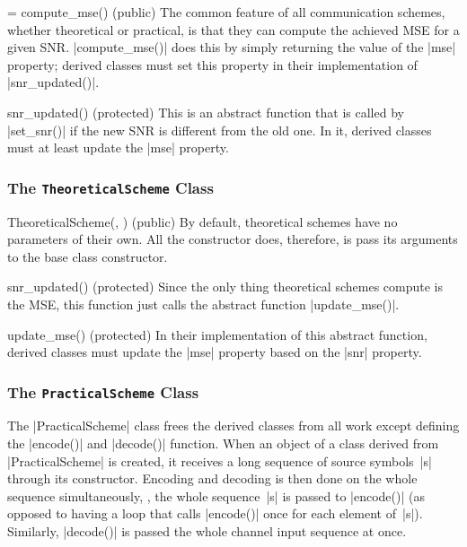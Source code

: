\begin{method}{ = compute_mse(\obj) (public)}
  The common feature of all communication schemes, whether theoretical or
  practical, is that they can compute the achieved MSE for a given SNR.
  |compute_mse()| does this by simply returning the value of the |mse| property;
  derived classes must set this property in their implementation of
  |snr_updated()|.
\end{method}

\begin{method}{snr_updated(\obj) (protected)}
  This is an abstract function that is called by |set_snr()| if the new SNR is
  different from the old one. In it, derived classes must at least update the
  |mse| property. 
\end{method}


\subsubsection{The \texttt{TheoreticalScheme} Class}

\begin{method}{TheoreticalScheme(, ) (public)}
  By default, theoretical schemes have no parameters of their own. All the
  constructor does, therefore, is pass its arguments to the base class
  constructor.
\end{method}

\begin{method}{snr\_updated(\obj) (protected)}
  Since the only thing theoretical schemes compute is the MSE, this function
  just calls the abstract function |update_mse()|.
\end{method}

\begin{method}{update\_mse(\obj) (protected)}
  In their implementation of this abstract function, derived classes must update
  the |mse| property based on the |snr| property. 
\end{method}


\subsubsection{The \texttt{PracticalScheme} Class}

The |PracticalScheme| class frees the derived classes from all work except
defining the |encode()| and |decode()| function. When an object of a class
derived from |PracticalScheme| is created, it receives a long sequence of source
symbols~|s| through its constructor. Encoding and decoding is then done on the
whole sequence simultaneously, \ie, the whole sequence~|s| is passed to
|encode()| (as opposed to having a loop that calls |encode()| once for each
element of~|s|). Similarly, |decode()| is passed the whole channel input
sequence at once.

